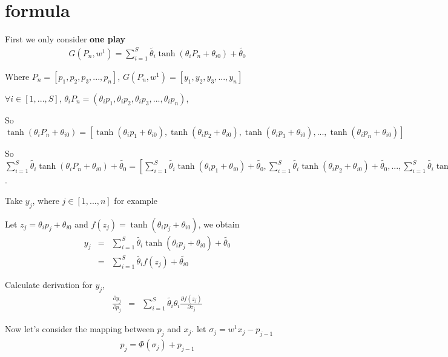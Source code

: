 \documentclass[11pt]{article}
\date{\today}
\title{}
\begin{document}
\tableofcontents

\section{formula}
\label{sec:org7fa5d38}
First we only consider \textbf{one play}
\begin{eqnarray}
G(P_{n}, w^{1}) = \sum_{i=1}^{S} \tilde{\theta_{i}} \tanh(\theta_{i} P_{n} + \theta_{i0}) + \tilde{\theta_{0}}
\end{eqnarray}

Where \(P_{n} = [p_{1}, p_{2}, p_{3}, ..., p_{n}]\), \(G(P_{n}, w^{1}) = [y_{1}, y_{2}, y_{3}, ..., y_{n}]\)

\(\forall{i} \in [1, ..., S]\), \(\theta_{i} P_{n} = (\theta_{i} p_{1}, \theta_{i} p_{2}, \theta_{i} p_{3}, ..., \theta_{i} p_{n})\),

So
\(\tanh(\theta_{i} P_{n} + \theta_{i0}) =
[\tanh(\theta_{i} p_{1} + \theta_{i0}),
\tanh(\theta_{i} p_{2} + \theta_{i0}),
\tanh(\theta_{i} p_{3} + \theta_{i0}),
...,
\tanh(\theta_{i} p_{n} + \theta_{i0})]\)

So \(\sum_{i=1}^{S} \tilde{\theta_{i}} \tanh(\theta_{i} P_{n} + \theta_{i0}) + \tilde{\theta_{0}} =
[\sum_{i=1}^{S} \tilde{\theta_{i}} \tanh(\theta_{i} p_{1} + \theta_{i0}) + \tilde{\theta_{0}},
\sum_{i=1}^{S} \tilde{\theta_{i}} \tanh(\theta_{i} p_{2} + \theta_{i0}) + \tilde{\theta_{0}},
...,
\sum_{i=1}^{S} \tilde{\theta_{i}} \tanh(\theta_{i} p_{n} + \theta_{i0}) + \tilde{\theta_{0}}] =
[y_{1}, y_{2}, ..., y_{n}]\).

Take \(y_{j}\), where \(j \in [1, ..., n]\) for example

Let \(z_j=\theta_i p_j + \theta_{i0}\) and \(f(z_j) = \tanh(\theta_i p_j + \theta_{i0})\), we obtain
\begin{eqnarray}
y_{j}  &=& \sum_{i=1}^{S} \tilde{\theta_{i}} \tanh(\theta_{i} p_{j} + \theta_{i0}) + \tilde{\theta_{0}}  \\
       &=& \sum_{i=1}^{S} \tilde{\theta_{i}} f(z_j) + \tilde{\theta_{i0}}
\end{eqnarray}

Calculate derivation for \(y_{j}\),
\begin{eqnarray}
\frac{\partial y_{j}}{\partial p_{j}} &=& \sum_{i=1}^{S} \tilde{\theta_{i}} \theta_{i} \frac{\partial f(z_j)}{\partial z_{j}}
\end{eqnarray}

Now let's consider the mapping between \(p_{j}\) and \(x_{j}\). let \(\sigma_{j} = w^{1} x_{j} - p_{j-1}\)
\begin{eqnarray}
p_{j} = \Phi(\sigma_{j}) + p_{j-1}
\end{eqnarray}
\end{document}
